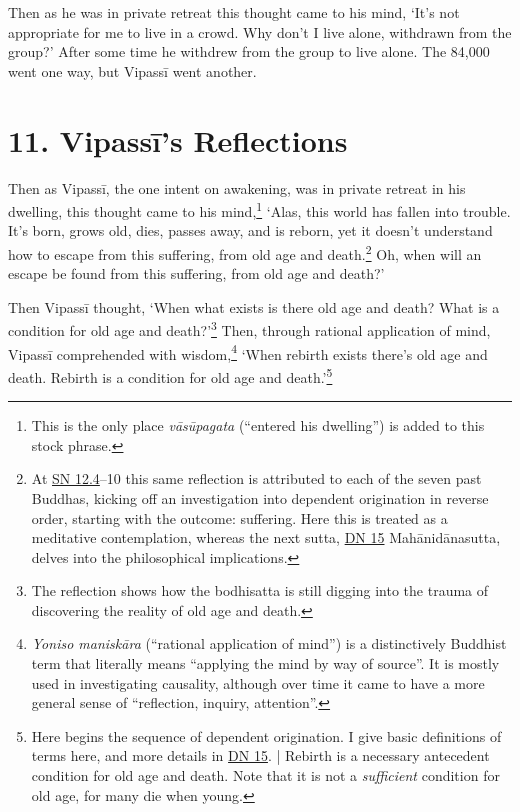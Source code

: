 \documentclass[12pt,openany]{book}%
\begin{document}
Then as he was in private retreat this thought came to his mind, ‘It’s not appropriate for me to live in a crowd. Why don’t I live alone, withdrawn from the group?’ After some time he withdrew from the group to live alone. The 84,000 went one way, but \textsanskrit{Vipassī} went another. 

\section*{11. \textsanskrit{Vipassī}’s Reflections }

Then as \textsanskrit{Vipassī}, the one intent on awakening, was in private retreat in his dwelling, this thought came to his mind,\footnote{This is the only place \textit{\textsanskrit{vāsūpagata}} (“entered his dwelling”) is added to this stock phrase. } ‘Alas, this world has fallen into trouble. It’s born, grows old, dies, passes away, and is reborn, yet it doesn’t understand how to escape from this suffering, from old age and death.\footnote{At \href{https://suttacentral.net/sn12.4/en/sujato}{SN 12.4}–10 this same reflection is attributed to each of the seven past Buddhas, kicking off an investigation into dependent origination in reverse order, starting with the outcome: suffering. Here this is treated as a meditative contemplation, whereas the next sutta, \href{https://suttacentral.net/dn15/en/sujato}{DN 15} \textsanskrit{Mahānidānasutta}, delves into the philosophical implications. } Oh, when will an escape be found from this suffering, from old age and death?’ 

Then \textsanskrit{Vipassī} thought, ‘When what exists is there old age and death? What is a condition for old age and death?’\footnote{The reflection shows how the bodhisatta is still digging into the trauma of discovering the reality of old age and death. } Then, through rational application of mind, \textsanskrit{Vipassī} comprehended with wisdom,\footnote{\textit{Yoniso \textsanskrit{maniskāra}} (“rational application of mind”) is a distinctively Buddhist term that literally means “applying the mind by way of source”. It is mostly used in investigating causality, although over time it came to have a more general sense of “reflection, inquiry, attention”. } ‘When rebirth exists there’s old age and death. Rebirth is a condition for old age and death.’\footnote{Here begins the sequence of dependent origination. I give basic definitions of terms here, and more details in \href{https://suttacentral.net/dn15/en/sujato}{DN 15}. | Rebirth is a necessary antecedent condition for old age and death. Note that it is not a \emph{sufficient} condition for old age, for many die when young. } 
\end{document}
